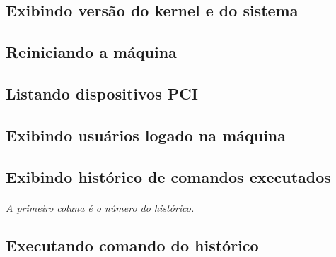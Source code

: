 \documentclass[a4paper,9pt]{extarticle}
\begin{document}
\begin{multicols}{2}
\subsection{Exibindo versão do kernel e do sistema}
	
	
\subsection{Reiniciando a máquina}
	
	
\subsection{Listando dispositivos PCI}
	
	
\subsection{Exibindo usuários logado na máquina}

	
\subsection{Exibindo histórico de comandos executados} 
	
	\paragraph{} \emph{A primeiro coluna é o número do histórico.}
	
\subsection{Executando comando do histórico}



\end{multicols}
\end{document}
